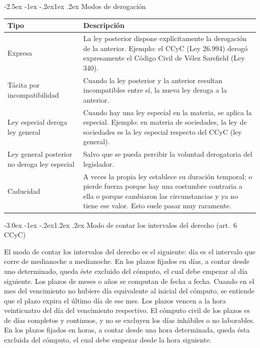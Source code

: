 \documentclass[12pt,oneside]{book}
\makeatletter
\renewcommand\section{\@startsection{section}{1}{\z@}%
  {-3.0ex \@plus -1ex \@minus -.2ex}{1.2ex \@plus .2ex}%
  {\normalfont\large\bfseries\color{acento}}}
\renewcommand\subsection{\@startsection{subsection}{2}{\z@}%
  {-2.5ex \@plus -1ex \@minus -.2ex}{1ex \@plus .2ex}%
  {\normalfont\normalsize\bfseries}}
\makeatother
\begin{document}
\subsection{Modos de derogación}

\begin{table}[H]
\centering
\begin{tabularx}{\textwidth}{>{\raggedright\arraybackslash}p{} >{\raggedright\arraybackslash}X}
\toprule
\textbf{Tipo} & \textbf{Descripción} \\
\midrule
Expresa &
La ley posterior dispone explícitamente la derogación de la anterior. Ejemplo: el CCyC (Ley 26.994) derogó expresamente el Código Civil de Vélez Sarsfield (Ley 340). \\
\addlinespace
Tácita por incompatibilidad &
Cuando la ley posterior y la anterior resultan incompatibles entre sí, la nueva ley deroga a la anterior. \\
\addlinespace
Ley especial deroga ley general &
Cuando hay una ley especial en la materia, se aplica la especial. Ejemplo: en materia de sociedades, la ley de sociedades es la ley especial respecto del CCyC (ley general). \\
\addlinespace
Ley general posterior no deroga ley especial &
Salvo que se pueda percibir la voluntad derogatoria del legislador. \\
\addlinespace
Caducidad &
A veces la propia ley establece su duración temporal; o pierde fuerza porque hay una costumbre contraria a ella o porque cambiaron las circunstancias y ya no tiene ese valor. Esto suele pasar muy raramente. \\
\bottomrule
\end{tabularx}
\end{table}

\section{Modo de contar los intervalos del derecho (art.~6 CCyC)}

\begin{regla}
El modo de contar los intervalos del derecho es el siguiente: día es el intervalo que corre de medianoche a medianoche. En los plazos fijados en días, a contar desde uno determinado, queda éste excluido del cómputo, el cual debe empezar al día siguiente. Los plazos de meses o años se computan de fecha a fecha. Cuando en el mes del vencimiento no hubiere día equivalente al inicial del cómputo, se entiende que el plazo expira el último día de ese mes. Los plazos vencen a la hora veinticuatro del día del vencimiento respectivo. El cómputo civil de los plazos es de días completos y continuos, y no se excluyen los días inhábiles o no laborables. En los plazos fijados en horas, a contar desde una hora determinada, queda ésta excluida del cómputo, el cual debe empezar desde la hora siguiente.
\end{regla}
\end{document}

